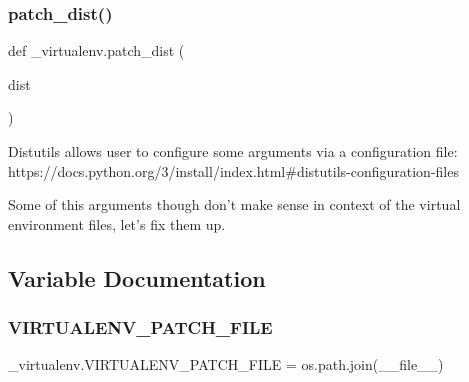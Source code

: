 \subsubsection{\texorpdfstring{patch\+\_\+dist()}{patch\_dist()}}
{\footnotesize\ttfamily def \+\_\+virtualenv.\+patch\+\_\+dist (\begin{DoxyParamCaption}\item[{}]{dist }\end{DoxyParamCaption})}

\begin{DoxyVerb}Distutils allows user to configure some arguments via a configuration file:
https://docs.python.org/3/install/index.html#distutils-configuration-files

Some of this arguments though don't make sense in context of the virtual environment files, let's fix them up.
\end{DoxyVerb}
 

\subsection{Variable Documentation}
\mbox{\label{namespace__virtualenv_aa31583cf1049cda450bcba7a29326484}} 
\subsubsection{\texorpdfstring{V\+I\+R\+T\+U\+A\+L\+E\+N\+V\+\_\+\+P\+A\+T\+C\+H\+\_\+\+F\+I\+LE}{VIRTUALENV\_PATCH\_FILE}}
{\footnotesize\ttfamily \+\_\+virtualenv.\+V\+I\+R\+T\+U\+A\+L\+E\+N\+V\+\_\+\+P\+A\+T\+C\+H\+\_\+\+F\+I\+LE = os.\+path.\+join(\+\_\+\+\_\+file\+\_\+\+\_\+)}

